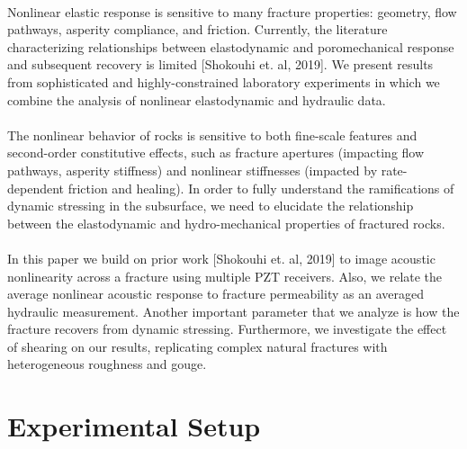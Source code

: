 \documentclass[letterpaper,10pt]{article}
\begin{document}
	\paragraph{} 
	Nonlinear elastic response is sensitive to many fracture properties: geometry, flow pathways, asperity compliance, and friction. Currently, the literature characterizing relationships between elastodynamic and poromechanical response and subsequent recovery is limited [Shokouhi et. al, 2019]. We present results from sophisticated and highly-constrained  laboratory experiments in which we combine the analysis of nonlinear elastodynamic and hydraulic data.
	
	\paragraph{} The nonlinear behavior of rocks is sensitive to both fine-scale features and second-order constitutive effects, such as fracture apertures (impacting flow pathways, asperity stiffness) and nonlinear stiffnesses (impacted by rate-dependent friction and healing). In order to fully understand the ramifications of dynamic stressing in the subsurface, we need to elucidate the relationship between the elastodynamic and hydro-mechanical properties of fractured rocks.
	
	\paragraph{}
	In this paper we build on prior work [Shokouhi et. al, 2019] to image acoustic nonlinearity across a fracture using multiple PZT receivers. Also, we relate the average nonlinear acoustic response to fracture permeability as an averaged hydraulic measurement. Another important parameter that we analyze is how the fracture recovers from dynamic stressing. Furthermore, we investigate the effect of shearing on our results, replicating complex natural fractures with heterogeneous roughness and gouge.     
	
	
	
	\section{Experimental Setup}
	\label{sec:experimnt_setup}
	
\end{document}
